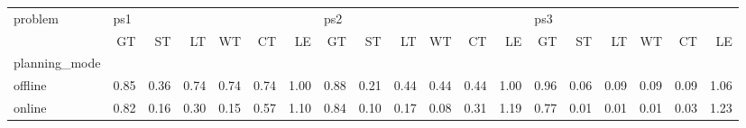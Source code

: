 \begin{tabular}{lrrrrrrrrrrrrrrrrrr}
\toprule
problem & \multicolumn{6}{l}{ps1} & \multicolumn{6}{l}{ps2} & \multicolumn{6}{l}{ps3} \\
{} &   GT &   ST &   LT &   WT &   CT &   LE &   GT &   ST &   LT &   WT &   CT &   LE &   GT &   ST &   LT &   WT &   CT &   LE \\
planning\_mode &      &      &      &      &      &      &      &      &      &      &      &      &      &      &      &      &      &      \\
\midrule
offline       & 0.85 & 0.36 & 0.74 & 0.74 & 0.74 & 1.00 & 0.88 & 0.21 & 0.44 & 0.44 & 0.44 & 1.00 & 0.96 & 0.06 & 0.09 & 0.09 & 0.09 & 1.06 \\
online        & 0.82 & 0.16 & 0.30 & 0.15 & 0.57 & 1.10 & 0.84 & 0.10 & 0.17 & 0.08 & 0.31 & 1.19 & 0.77 & 0.01 & 0.01 & 0.01 & 0.03 & 1.23 \\
\bottomrule
\end{tabular}

